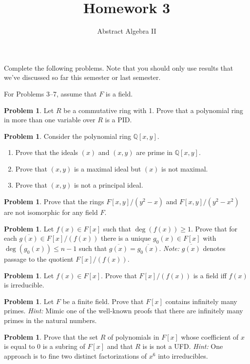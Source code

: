 \documentclass[11pt]{scrartcl}
\theoremstyle{definition}
\newtheorem{problem}[theorem]{Problem}
\newcommand{\blankline}{\pagebreak[2]\vspace{.5\baselineskip}}
\begin{document}
\title{Homework 3}
\subtitle{Abstract Algebra II}
\date{}

\maketitle
\thispagestyle{fancy}

Complete the following problems. Note that you should only use results that we've discussed so far this semester or last semester.

\blankline

For Problems 3--7, assume that $F$ is a field.

\begin{problem}
Let $R$ be a commutative ring with 1.  Prove that a polynomial ring in more than one variable over $R$ is a PID.
\end{problem}

\begin{problem}
Consider the polynomial ring $\mathbb{Q}[x,y]$.
\begin{enumerate}[label=\rm{(\alph*)}]
\item Prove that the ideals $(x)$ and $(x,y)$ are prime in $\mathbb{Q}[x,y]$.
\item Prove that $(x,y)$ is a maximal ideal but $(x)$ is not maximal.
\item Prove that $(x,y)$ is not a principal ideal.
\end{enumerate}
\end{problem}

\begin{problem}
Prove that the rings $F[x,y]/(y^2-x)$ and $F[x,y]/(y^2-x^2)$ are not isomorphic for any field $F$.
\end{problem}

\begin{problem}
Let $f(x)\in F[x]$ such that $\deg(f(x))\geq 1$.  Prove that for each $\overline{g(x)}\in F[x]/(f(x))$ there is a unique $g_0(x)\in F[x]$ with $\deg(g_0(x))\leq n-1$ such that $\overline{g(x)}=\overline{g_0(x)}$. \emph{Note:} $\overline{g(x)}$ denotes passage to the quotient $F[x]/(f(x))$.
\end{problem}

\begin{problem}
Let $f(x)\in F[x]$.  Prove that $F[x]/(f(x))$ is a field iff $f(x)$ is irreducible.
\end{problem}

\begin{problem}
Let $F$ be a finite field.  Prove that $F[x]$ contains infinitely many primes. \emph{Hint:} Mimic one of the well-known proofs that there are infinitely many primes in the natural numbers.  
\end{problem}

\begin{problem}
Prove that the set $R$ of polynomials in $F[x]$ whose coefficient of $x$ is equal to 0 is a subring of $F[x]$ and that $R$ is is not a UFD.  \emph{Hint:} One approach is to fine two distinct factorizations of $x^6$ into irreducibles.
\end{problem}
\end{document}
